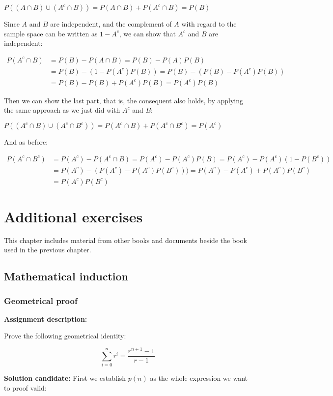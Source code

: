 \documentclass{report}
\newcommand{\cent}[1]{\begin{center}#1\end{center}}
\newcommand{\mAlign}[1]{\begin{align*}#1\end{align*}}
\newcommand{\AssignmentDescription}{\textbf{Assignment description: }}
\newcommand{\Solution}{\textbf{Solution candidate: }}
\newcommand{\QED}{\boxed{}}
\begin{document}
 	\cent{$P((A \cap B) \cup (A^c \cap B)) = P(A \cap B) + P(A^c \cap B) = P(B)$}
 	
 	Since $A$ and $B$ are independent, and the complement of $A$ with regard to the sample space can be written as $1-A^c$, we can show that $A^c$ and $B$ are independent:
 	
 	
 	\mAlign{
 		P(A^c \cap B) &= P(B) -P(A \cap B) = P(B) -P(A)P(B) \\
 								 &= P(B) - (1-P(A^c)P(B)) = P(B) -(P(B) - P(A^c)P(B)) \\
 								 &= P(B) - P(B) + P(A^c)P(B) = P(A^c)P(B) 
 	}
 	
 	Then we can show the last part, that is,  the consequent also holds, by applying the same approach as we just did with $A^c$ and $B$:
 	
 	\cent{$P((A^c \cap B) \cup (A^c \cap B^c)) = P(A^c \cap B) + P(A^c \cap B^c) = P(A^c)$}
 	
 	And as before:
 	
 	\mAlign{
 		P(A^c \cap B^c) &= P(A^c) - P(A^c \cap B) = P(A^c) - P(A^c)P(B) = P(A^c) - P(A^c)(1-P(B^c)) \\
 									 &= P(A^c) - (P(A^c) -P(A^c)P(B^c))) = P(A^c) - P(A^c) + P(A^c)P(B^c) \\
 									 &= P(A^c)P(B^c)
 	}
 	
 	\QED
 	
 	\chapter{Additional exercises}
 	
 	This chapter includes material from other books and documents beside the book used in the previous chapter.
 	
 	\pagebreak
 	
 	\section{Mathematical induction}
 	
 	\subsection{Geometrical proof}
 	
 	\AssignmentDescription
 	
 	Prove the following geometrical identity:
 	
 	\cent{$$\sum_{i=0}^{n} r^i = \dfrac{r^{n+1} - 1}{r-1}$$}
 	
 	\Solution
	First we establish $p(n)$ as the whole expression we want to proof valid:
	
\end{document}
